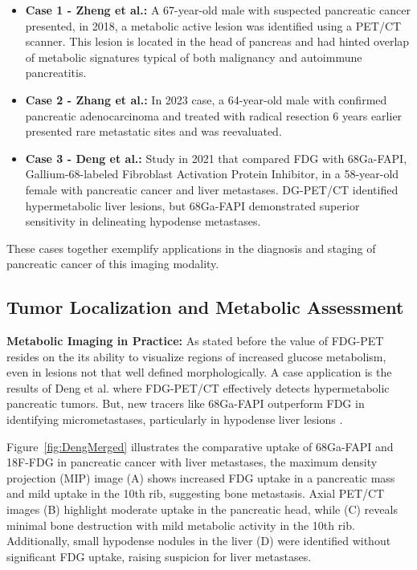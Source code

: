 \begin{multicols}{2}
\begin{itemize}
	\item \textbf{Case 1 - Zheng et al.:} 
	A 67-year-old male  with suspected pancreatic cancer presented, in 2018, a metabolic active lesion was identified using a PET/CT scanner. This lesion is located in the head of pancreas and had hinted overlap of metabolic signatures typical of both malignancy and autoimmune pancreatitis\cite{Zheng2018}.
	\item \textbf{Case 2 - Zhang et al.:} 
	In 2023 case, a 64-year-old male with confirmed pancreatic adenocarcinoma and treated with radical resection 6 years earlier presented rare metastatic sites and was reevaluated\cite{Zhang2023}.
	\item \textbf{Case 3 - Deng et al.:} 
	Study in 2021 that compared FDG with 68Ga-FAPI, Gallium-68-labeled Fibroblast Activation Protein Inhibitor, in a 58-year-old female with pancreatic cancer and liver metastases. DG-PET/CT identified hypermetabolic liver lesions, but 68Ga-FAPI demonstrated superior sensitivity in delineating hypodense metastases\cite{Deng2021}.
\end{itemize}

These cases together exemplify applications in the diagnosis and staging of pancreatic cancer of this imaging modality.

\subsection{Tumor Localization and Metabolic Assessment}

\textbf{Metabolic Imaging in Practice:} As stated before the value of FDG-PET resides on the its ability to visualize regions of increased glucose metabolism, even in lesions not that well defined morphologically. A case application is the results of Deng et al. where FDG-PET/CT effectively detects hypermetabolic pancreatic tumors. But, new tracers like 68Ga-FAPI outperform FDG in identifying micrometastases, particularly in hypodense liver lesions \cite{Deng2021}. %

Figure~\ref{fig:DengMerged} illustrates the comparative uptake of 68Ga-FAPI and 18F-FDG in pancreatic cancer with liver metastases, the maximum density projection (MIP) image (A) shows increased FDG uptake in a pancreatic mass and mild uptake in the 10th rib, suggesting bone metastasis. Axial PET/CT images (B) highlight moderate uptake in the pancreatic head, while (C) reveals minimal bone destruction with mild metabolic activity in the 10th rib. Additionally, small hypodense nodules in the liver (D) were identified without significant FDG uptake, raising suspicion for liver metastases.


\end{multicols}

